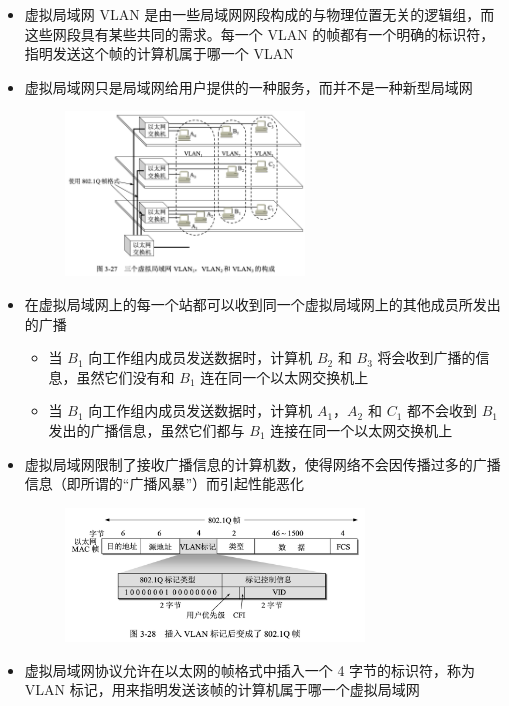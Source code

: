 \documentclass[cs4size,a4paper,10pt]{ctexart}
\begin{document}
	\begin{itemize}
		\item 虚拟局域网 VLAN 是由一些局域网网段构成的与物理位置无关的逻辑组，而这些网段具有某些共同的需求。每一个 VLAN 的帧都有一个明确的标识符，指明发送这个帧的计算机属于哪一个 VLAN
		\item 虚拟局域网只是局域网给用户提供的一种服务，而并不是一种新型局域网
		\begin{figure}[H]
			\centering
			\includegraphics[width=0.6\textwidth]{img/3.27}
		\end{figure}
		\item 在虚拟局域网上的每一个站都可以收到同一个虚拟局域网上的其他成员所发出的广播
		\begin{itemize}
			\item 当 $B_1$ 向工作组内成员发送数据时，计算机 $B_2$ 和 $B_3$ 将会收到广播的信息，虽然它们没有和 $B_1$ 连在同一个以太网交换机上
			\item 当 $B_1$ 向工作组内成员发送数据时，计算机 $A_1$，$A_2$ 和 $C_1 $ 都不会收到 $B_1$ 发出的广播信息，虽然它们都与 $B_1$ 连接在同一个以太网交换机上
		\end{itemize}
		\item 虚拟局域网限制了接收广播信息的计算机数，使得网络不会因传播过多的广播信息（即所谓的“广播风暴”）而引起性能恶化
		\begin{figure}[H]
			\centering
			\includegraphics[width=0.75\textwidth]{img/3.28}
		\end{figure}
		\item 虚拟局域网协议允许在以太网的帧格式中插入一个 4 字节的标识符，称为 VLAN 标记，用来指明发送该帧的计算机属于哪一个虚拟局域网

\end{itemize}
\end{document}
